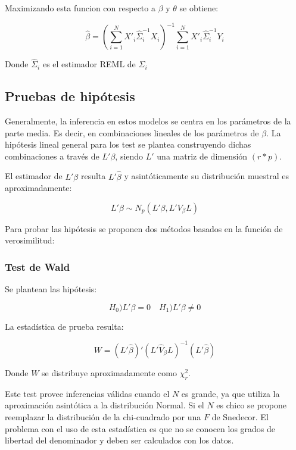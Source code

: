 \documentclass[12pt]{article}
\begin{document}
Maximizando esta funcion con respecto a $\beta$ y $\theta$ se obtiene:

\[ \hat{\beta} = (\sum_{i=1}^{N} X'_i \hat{\varSigma}_i^{-1} X_i)^{-1} \sum_{i=1}^{N} X'_i \hat{\varSigma}_i^{-1} Y_i\]

Donde $\hat{\varSigma}_i$ es el estimador REML de ${\varSigma_i}$

\subsection{Pruebas de hipótesis}

Generalmente, la inferencia en estos modelos se centra en los parámetros de la parte media. Es decir, en combinaciones
lineales de los parámetros de $\beta$. La hipótesis lineal general para los test se plantea construyendo dichas combinaciones
a través de $L'\beta$, siendo $L'$ una matriz de dimensión $(r*p)$.

El estimador de $L'\beta$ resulta $L'\hat{\beta}$ y asintóticamente su distribución muestral es aproximadamente:

\[ L'\beta \sim N_p(L'\beta, L'V_{\beta}L) \]

Para probar las hipótesis se proponen dos métodos basados en la función de verosimilitud:

\subsubsection{Test de Wald}

Se plantean las hipótesis:

\[ H_0) L'\beta = 0 \quad H_1) L'\beta \neq 0 \]

La estadística de prueba resulta:

\[ W = (L'\hat{\beta})' (L'\hat{V}_{\beta}L)^{-1} (L'\hat{\beta}) \]

Donde $W$ se distribuye aproximadamente como $\chi_r^2$.

Este test provee inferencias válidas cuando el $N$ es grande, ya que utiliza la aproximación asintótica a la distribución
Normal. Si el $N$ es chico se propone reemplazar la distribución de la chi-cuadrado por una $F$ de Snedecor. El problema
con el uso de esta estadística es que no se conocen los grados de libertad del denominador y deben ser calculados con los
datos. 

\end{document}
